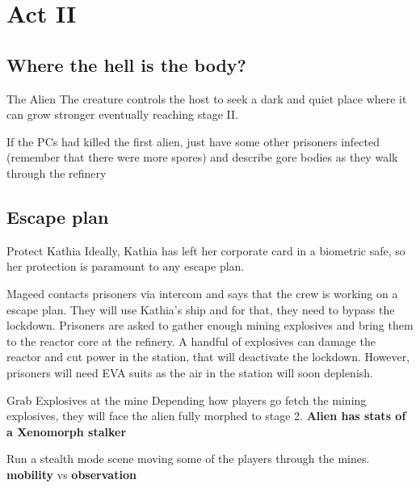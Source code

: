 \chapter{Act II}




\section{Where the hell is the body?}


\begin{rpg-commentbox}{The Alien}
   The creature controls the host to seek a dark and quiet place where it can grow stronger eventually reaching stage II.

    
    \medskip

    If the PCs had killed the first alien, just have some other prisoners infected (remember that there were more spores)
    and describe gore bodies as they walk through the refinery
\end{rpg-commentbox}




\newsect

\section{Escape plan}


\begin{rpg-commentbox}{Protect Kathia}
    Ideally, Kathia has left her corporate card in a biometric safe, so her protection is paramount to any escape plan.

    Mageed contacts prisoners via intercom and says that the crew is working on a escape plan. They will use Kathia's ship and for that, they need to bypass the lockdown.
    Prisoners are asked to gather enough mining explosives and bring them to the reactor core at the refinery. A handful of explosives can damage the reactor and cut power in the station, that will deactivate the lockdown. However, prisoners will need EVA suits as the air in the station will soon deplenish.
 \end{rpg-commentbox}


 \begin{rpg-commentbox}{Grab Explosives at the mine}
    Depending how players go fetch the mining explosives, they will face the alien fully morphed to stage 2. \textbf{Alien has stats of a Xenomorph stalker}

    Run a stealth mode scene moving some of the players through the mines. \textbf{mobility} vs \textbf{observation}
 \end{rpg-commentbox}


